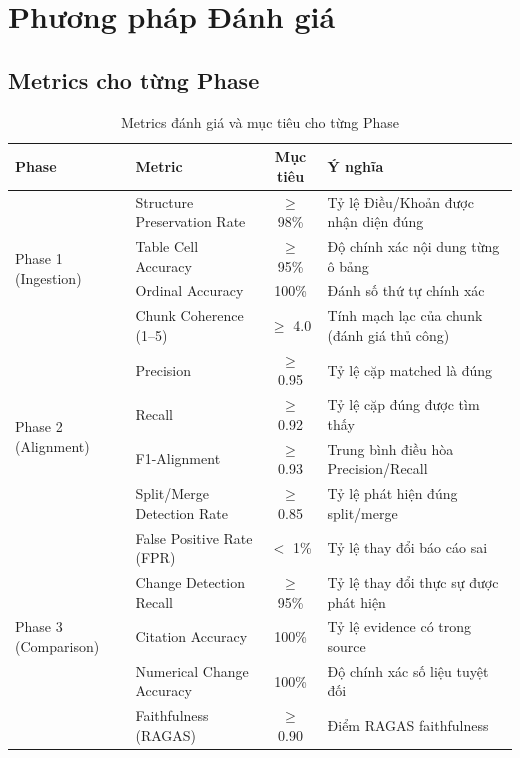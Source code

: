 \section{Phương pháp Đánh giá}

\subsection{Metrics cho từng Phase}

\begin{table}[H]
    \centering
    \caption{Metrics đánh giá và mục tiêu cho từng Phase}
    \label{tab:metrics_overview}
    \begin{tabularx}{\textwidth}{p{2.5cm} X c X}
        \toprule
        \textbf{Phase} & \textbf{Metric} & \textbf{Mục tiêu} & \textbf{Ý nghĩa}\\
        \midrule
        \multirow{4}{*}{Phase 1 (Ingestion)} & Structure Preservation Rate & $\geq$ 98\% & Tỷ lệ Điều/Khoản được nhận diện đúng\\
        & Table Cell Accuracy & $\geq$ 95\% & Độ chính xác nội dung từng ô bảng\\
        & Ordinal Accuracy & 100\% & Đánh số thứ tự chính xác\\
        & Chunk Coherence (1--5) & $\geq$ 4.0 & Tính mạch lạc của chunk (đánh giá thủ công)\\
        \midrule
        \multirow{4}{*}{Phase 2 (Alignment)} & Precision & $\geq$ 0.95 & Tỷ lệ cặp matched là đúng\\
        & Recall & $\geq$ 0.92 & Tỷ lệ cặp đúng được tìm thấy\\
        & F1-Alignment & $\geq$ 0.93 & Trung bình điều hòa Precision/Recall\\
        & Split/Merge Detection Rate & $\geq$ 0.85 & Tỷ lệ phát hiện đúng split/merge\\
        \midrule
        \multirow{5}{*}{Phase 3 (Comparison)} & False Positive Rate (FPR) & $<$ 1\% & Tỷ lệ thay đổi báo cáo sai\\
        & Change Detection Recall & $\geq$ 95\% & Tỷ lệ thay đổi thực sự được phát hiện\\
        & Citation Accuracy & 100\% & Tỷ lệ evidence có trong source\\
        & Numerical Change Accuracy & 100\% & Độ chính xác số liệu tuyệt đối\\
        & Faithfulness (RAGAS) & $\geq$ 0.90 & Điểm RAGAS faithfulness \cite{es2024ragas}\\
        \bottomrule
    \end{tabularx}
\end{table}

